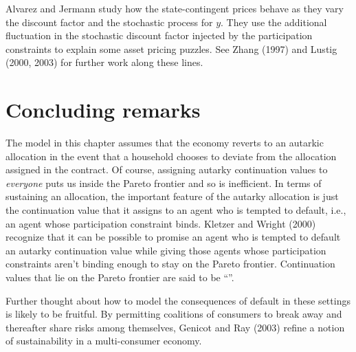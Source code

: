 Alvarez and Jermann study how the state-contingent prices
 behave as they vary the discount factor and the
stochastic process for $y$.  They use the additional fluctuation
in the stochastic discount factor injected by the participation
constraints to explain some asset pricing puzzles.  See Zhang
(1997) and Lustig (2000, 2003) for further work along these lines.
 

\section{Concluding remarks}

   The model in this chapter assumes that the economy
   reverts to an autarkic allocation in the event that a household
chooses to deviate from the allocation assigned in the contract.
Of course, assigning  autarky continuation values to {\it
everyone\/} puts us inside the Pareto frontier and so is
inefficient. In terms of sustaining an allocation, the important
feature of  the autarky allocation  is just the continuation value
that it assigns to an agent who is tempted to default, i.e., an
agent whose participation constraint binds. Kletzer and Wright
(2000) recognize that it can be possible to promise an agent who
is tempted to default an autarky continuation value while giving
those agents whose participation constraints aren't binding enough
to stay on the Pareto frontier. Continuation values that lie on
the Pareto frontier are said to be ``''.

Further thought about how to model the consequences of default in
these settings is likely to be fruitful. By  permitting coalitions
of consumers to break away and thereafter share risks among
themselves, Genicot and Ray (2003)  refine a notion of
sustainability in
 a  multi-consumer economy.

 
 \showchaptIDfalse \showsectIDfalse
